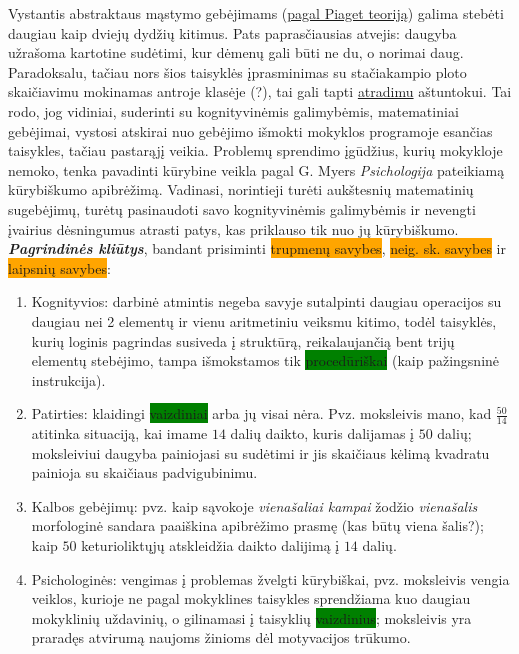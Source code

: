 \documentclass[a4paper]{article}
\begin{document}
Vystantis abstraktaus mąstymo gebėjimams (\href{https://www.dropbox.com/s/n47u1fwlxabs472/Abstract\%20thinking\%20testas.pdf?dl=0}{pagal Piaget teoriją}) galima stebėti daugiau kaip dviejų dydžių kitimus. Pats paprasčiausias atvejis: daugyba užrašoma kartotine sudėtimi, kur dėmenų gali būti ne du, o norimai daug. Paradoksalu, tačiau nors šios taisyklės įprasminimas su stačiakampio ploto skaičiavimu mokinamas antroje klasėje (?), tai gali tapti \href{https://vmiezys.wordpress.com/2019/01/07/tado-ir-vytauto-nuotykiai-3-dalis/}{atradimu} aštuntokui. Tai rodo, jog vidiniai, suderinti su kognityvinėmis galimybėmis, matematiniai gebėjimai, vystosi atskirai nuo gebėjimo išmokti mokyklos programoje esančias taisykles, tačiau pastarąjį veikia. Problemų sprendimo įgūdžius, kurių mokykloje nemoko, tenka pavadinti kūrybine veikla pagal G. Myers \textit{Psichologija} pateikiamą kūrybiškumo apibrėžimą. Vadinasi, norintieji turėti aukštesnių matematinių sugebėjimų, turėtų pasinaudoti savo kognityvinėmis galimybėmis ir nevengti įvairius dėsningumus atrasti patys, kas priklauso tik nuo jų kūrybiškumo. \textit{\textbf{Pagrindinės kliūtys}}, bandant prisiminti \colorbox{orange}{trupmenų savybes}, \colorbox{orange}{neig. sk. savybes} ir \colorbox{orange}{laipsnių savybes}:
\begin{enumerate}
\item Kognityvios: darbinė atmintis negeba savyje sutalpinti daugiau operacijos su daugiau nei 2 elementų ir vienu aritmetiniu veiksmu kitimo, todėl taisyklės, kurių loginis pagrindas susiveda į struktūrą, reikalaujančią bent trijų elementų stebėjimo, tampa išmokstamos tik \colorbox{green}{procedūriškai} (kaip pažingsninė instrukcija).
\item Patirties: klaidingi \colorbox{green}{vaizdiniai} arba jų visai nėra. Pvz. moksleivis mano, kad $\frac{50}{14}$ atitinka situaciją, kai imame $14$ dalių daikto, kuris dalijamas į $50$ dalių; moksleiviui daugyba painiojasi su sudėtimi ir jis skaičiaus kėlimą kvadratu painioja su skaičiaus padvigubinimu.
\item Kalbos gebėjimų: pvz. kaip sąvokoje \textit{vienašaliai kampai} žodžio \textit{vienašalis} morfologinė sandara paaiškina apibrėžimo prasmę (kas būtų viena šalis?); kaip $50$ keturioliktųjų atskleidžia daikto dalijimą į $14$ dalių.
\item Psichologinės: vengimas į problemas žvelgti kūrybiškai, pvz. moksleivis vengia veiklos, kurioje ne pagal mokyklines taisykles sprendžiama kuo daugiau mokyklinių uždavinių, o gilinamasi į taisyklių \colorbox{green}{vaizdinius}; moksleivis yra praradęs atvirumą naujoms žinioms dėl motyvacijos trūkumo.
\end{enumerate}
\end{document}
